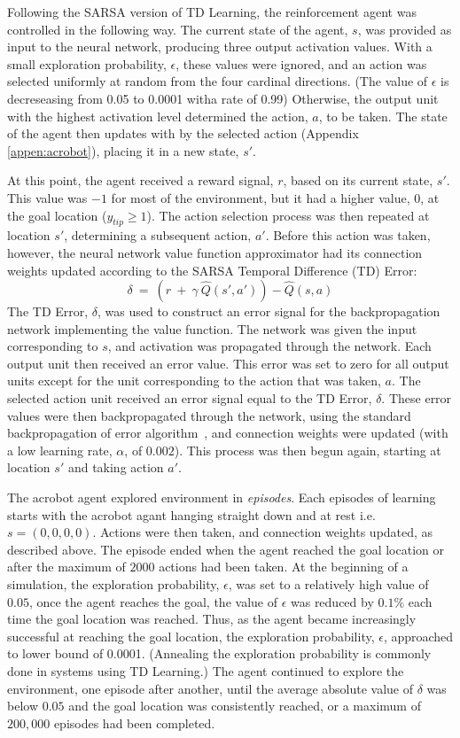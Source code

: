 \documentclass[preprint,12pt,authoryear]{elsarticle}
\begin{document}
Following the SARSA version of TD Learning, the reinforcement agent
was controlled in the following way. The current state of the
agent, $s$, was provided as input to the neural network, producing
three output activation values. With a small exploration probability,
$\epsilon$, these values were ignored, and an action was selected
uniformly at random from the four cardinal directions. (The value of
$\epsilon$ is decreseasing from 0.05 to 0.0001 witha rate of 0.99) Otherwise, the output unit
with the highest activation level determined the action, $a$, to be
taken. The state of the agent then updates with by the selected action (Appendix \ref{appen:acrobot}), placing it in a new state, $s'$.



At this point, the agent received a reward signal, $r$, based on its
current state, $s'$. This value was $-1$ for most of the
environment, but it had a higher value, $0$, at the goal location ($y_{tip} \geq 1$). The action selection process was then repeated at location $s'$,
determining a subsequent action, $a'$. Before this action was taken,
however, the neural network value function approximator had its
connection weights updated according to the SARSA Temporal Difference
(TD) Error:
\[ \delta \ = \ \left( r \ + \ \gamma \ \hat{Q}(s',a') \right) -
   \hat{Q}(s,a) \]
The TD Error, $\delta$, was used to construct an error signal for the
backpropagation network implementing the value function. The network
was given the input corresponding to $s$, and activation was
propagated through the network. Each output unit then received an
error value. This error was set to zero for all output units except
for the unit corresponding to the action that was taken, $a$. The 
selected action unit received an error signal equal to the TD Error,
$\delta$. These error values were then backpropagated through the
network, using the standard backpropagation of error
algorithm~\citep{RumelhartDE:1986:BP}, and connection weights were
updated (with a low learning rate, $\alpha$, of $0.002$). This process
was then begun again, starting at location $s'$ and taking action
$a'$.

The acrobot agent explored environment in
\emph{episodes}. Each episodes of learning starts with the acrobot agant hanging straight down and at rest i.e. $s=(0,0,0,0)$. Actions
were then taken, and connection weights updated, as described
above. The episode ended when the agent reached the goal location or
after the maximum of $2000$ actions had been taken. At the beginning of
a simulation, the exploration probability, $\epsilon$, was set to a
relatively high value of $0.05$, once the agent reaches the goal, the value of $\epsilon$ was reduced by $0.1\%$ each time the goal location was reached. Thus, as the agent
became increasingly successful at reaching the goal location, the
exploration probability, $\epsilon$, approached to lower bound of 0.0001. (Annealing the
exploration probability is commonly done in systems using TD
Learning.) The agent continued to explore the environment, one episode
after another, until the average absolute value of $\delta$ was below
$0.05$ and the goal location was consistently reached, or a maximum of
$200,000$ episodes had been completed.
\end{document}
